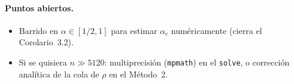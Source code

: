 \documentclass[11pt]{article}
\newcommand{\code}[1]{\texttt{#1}}
\begin{document}
\paragraph{Puntos abiertos.}
\begin{itemize}[leftmargin=*]
  \item Barrido en $\alpha\in[1/2,1]$ para estimar $\alpha_c$ num\'ericamente
        (cierra el Corolario~3.2).
  \item Si se quisiera $n\gg5120$: multiprecisi\'on (\code{mpmath}) en el \code{solve},
        o correcci\'on anal\'itica de la cola de $\rho$ en el M\'etodo~2.
\end{itemize}
\end{document}
